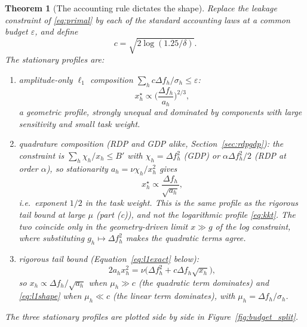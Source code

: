 \documentclass{ieeetj}
\theoremstyle{plain}
\newtheorem{theorem}{Theorem}
\theoremstyle{definition}
\begin{document}
\begin{theorem}[The accounting rule dictates the shape]
\label{th:shape}
Replace the leakage constraint of \eqref{eq:primal} by each of the standard
accounting laws at a common budget $\varepsilon$, and define
\begin{equation}
c=\sqrt{2\log(1.25/\delta)}.
\label{eq:tailconst}
\end{equation}
The stationary profiles are:
\begin{enumerate}
\item[(a)] \emph{amplitude-only $\ell_1$ composition}
$\sum_h c\Delta f_h/\sigma_h\le\varepsilon$:
\begin{equation}
x_h^{\star}\propto\Big(\frac{\Delta f_h}{a_h}\Big)^{2/3},
\label{eq:l1shape}
\end{equation}
a geometric profile, strongly unequal and dominated by components with large
sensitivity and small task weight.
\item[(b)] \emph{quadrature composition} (RDP and GDP alike,
Section~\ref{sec:rdpgdp}): the constraint is $\sum_h\chi_h/x_h\le B'$ with
$\chi_h=\Delta f_h^2$ (GDP) or $\alpha\Delta f_h^2/2$ (RDP at order $\alpha$),
so stationarity $a_h=\nu\chi_h/x_h^2$ gives
\begin{equation}
x_h^{\star}\propto\frac{\Delta f_h}{\sqrt{a_h}},
\label{eq:quadshape}
\end{equation}
i.e.\ exponent $1/2$ in the task weight. This is the same profile as the rigorous
tail bound at large $\mu$ (part (c)), and \emph{not} the logarithmic profile
\eqref{eq:kkt}. The two coincide only in the geometry-driven limit $x\gg g$ of
the log constraint, where substituting $g_h\mapsto\Delta f_h^2$ makes the
quadratic terms agree.
\item[(c)] \emph{rigorous tail bound} (Equation~\eqref{eq:l1exact} below):
\begin{equation}
2a_hx_h^{2}=\nu\big(\Delta f_h^{2}+c\Delta f_h\sqrt{x_h}\big),
\label{eq:l1exactshape}
\end{equation}
so $x_h\propto\Delta f_h/\sqrt{a_h}$ when $\mu_h\gg c$ (the quadratic term
dominates) and \eqref{eq:l1shape} when $\mu_h\ll c$ (the linear term dominates),
with $\mu_h=\Delta f_h/\sigma_h$.
\end{enumerate}
The three stationary profiles are plotted side by side in
Figure~\ref{fig:budget_split}.
\end{theorem}
\end{document}
